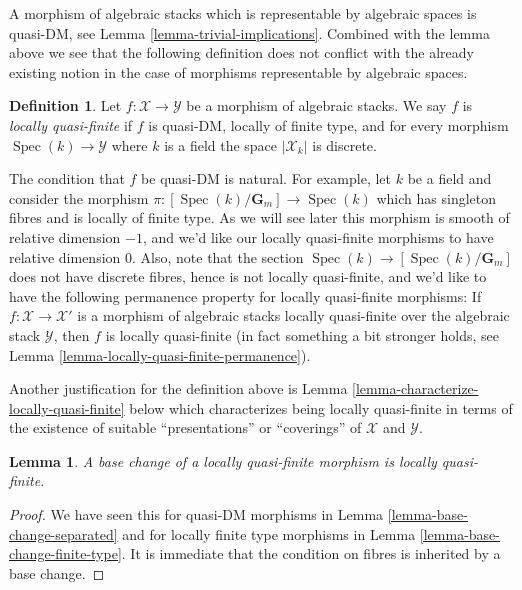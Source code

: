\documentclass{stacks-project}
\theoremstyle{plain}
\newtheorem{lemma}[subsection]{Lemma}
\theoremstyle{definition}
\newtheorem{definition}[subsection]{Definition}
\theoremstyle{remark}
\numberwithin{equation}{subsection}
\def\Spec{\mathop{\mathrm{Spec}}}
\begin{document}
\noindent
A morphism of algebraic stacks which is representable by algebraic spaces
is quasi-DM, see
Lemma \ref{lemma-trivial-implications}.
Combined with the lemma above we see that the following definition
does not conflict with the already existing notion in the case
of morphisms representable by algebraic spaces.

\begin{definition}
\label{definition-locally-quasi-finite}
Let $f : \mathcal{X} \to \mathcal{Y}$ be a morphism of algebraic stacks.
We say $f$ is {\it locally quasi-finite} if $f$ is quasi-DM, locally of
finite type, and for every morphism $\Spec(k) \to \mathcal{Y}$
where $k$ is a field the space $|\mathcal{X}_k|$ is discrete.
\end{definition}

\noindent
The condition that $f$ be quasi-DM is natural. For example, let $k$ be
a field and consider the morphism
$\pi : [\Spec(k)/\mathbf{G}_m] \to \Spec(k)$
which has singleton fibres and is locally of finite type. As we will see
later this morphism is smooth of relative dimension $-1$, and we'd
like our locally quasi-finite morphisms to have relative dimension $0$.
Also, note that the section $\Spec(k) \to [\Spec(k)/\mathbf{G}_m]$
does not have discrete fibres, hence is not locally quasi-finite, and we'd
like to have the following permanence property for locally quasi-finite
morphisms: If $f : \mathcal{X} \to \mathcal{X}'$ is a morphism of algebraic
stacks locally quasi-finite over the algebraic stack $\mathcal{Y}$, then
$f$ is locally quasi-finite (in fact something a bit stronger holds, see
Lemma \ref{lemma-locally-quasi-finite-permanence}).

\medskip\noindent
Another justification for the definition above is
Lemma \ref{lemma-characterize-locally-quasi-finite}
below which characterizes being locally quasi-finite in terms of the
existence of suitable ``presentations'' or ``coverings'' of
$\mathcal{X}$ and $\mathcal{Y}$.

\begin{lemma}
\label{lemma-base-change-locally-quasi-finite}
A base change of a locally quasi-finite morphism is locally quasi-finite.
\end{lemma}

\begin{proof}
We have seen this for quasi-DM morphisms in
Lemma \ref{lemma-base-change-separated}
and for locally finite type morphisms in
Lemma \ref{lemma-base-change-finite-type}.
It is immediate that the condition on fibres is inherited by a base change.
\end{proof}
\end{document}
